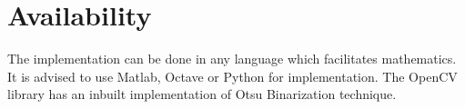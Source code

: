 \documentclass[BTech]{srmuthesis}
\begin{document}
\section{Availability}
The implementation can be done in any language which facilitates mathematics. It is advised to use Matlab, Octave or Python for implementation. The OpenCV library has an inbuilt implementation of Otsu Binarization technique.


\end{document}
